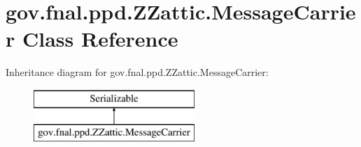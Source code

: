 \hypertarget{classgov_1_1fnal_1_1ppd_1_1ZZattic_1_1MessageCarrier}{\section{gov.\-fnal.\-ppd.\-Z\-Zattic.\-Message\-Carrier Class Reference}
\label{classgov_1_1fnal_1_1ppd_1_1ZZattic_1_1MessageCarrier}
}
Inheritance diagram for gov.\-fnal.\-ppd.\-Z\-Zattic.\-Message\-Carrier\-:\begin{figure}[H]
\begin{center}
\leavevmode
\includegraphics[height=2.000000cm]{classgov_1_1fnal_1_1ppd_1_1ZZattic_1_1MessageCarrier}
\end{center}
\end{figure}
